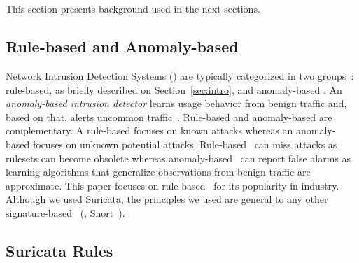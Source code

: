 \documentclass[conference]{IEEEtran}
\begin{document}
\section{\nids}
\label{sec:background}

This section presents background used in the next sections.

\subsection{Rule-based and Anomaly-based \nids}

\sloppy Network Intrusion Detection Systems (\nids{}) are typically
categorized in two groups~\cite{kumar2007survey}: rule-based, as
briefly described on Section~\ref{sec:intro}, and anomaly-based
\nids. An \emph{anomaly-based intrusion detector} learns usage
behavior from benign traffic and, based on that, alerts uncommon
traffic~\cite{7579764,kumar2007survey,Mitchell:2014:SID:2597757.2542049,cordy-etal-issta19}. Rule-based
\nids{} and anomaly-based \nids{} are complementary. A rule-based
\nids{} focuses on known attacks whereas an anomaly-based \nids{}
focuses on unknown potential attacks. Rule-based \nids\ can miss
attacks as rulesets can become obsolete whereas anomaly-based
\nids\ can report false alarms as learning algorithms that generalize
observations from benign traffic are approximate.  This paper focuses
on rule-based \nids\ for its popularity in industry. Although we used
Suricata, the principles we used are general to any other
signature-based \nids~(\eg{}, Snort~\cite{snort}).




\subsection{Suricata Rules}
\label{sec:example-suricata-rules}

\end{document}
